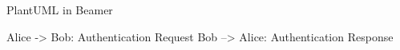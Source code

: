 \documentclass{beamer}
\begin{document}
\begin{frame}[fragile]{PlantUML in Beamer}
\begin{plantuml}
Alice -> Bob: Authentication Request
Bob --> Alice: Authentication Response
\end{plantuml}
\end{frame}
\end{document}
